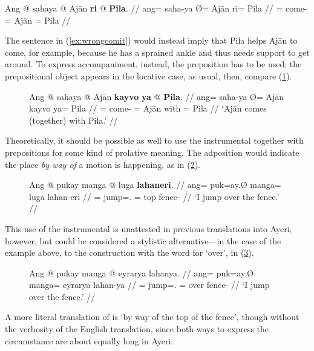 \ex\label{ex:wrongcomit}\ljudge* \begingl
	\gla Ang @ sahaya {} @ Ajān \textbf{ri} @ \textbf{Pila}. //
	\glb ang= saha-ya Ø= Ajān ri= Pila //
	\glc \AgtT{}= come-\TsgM{} \Top{}= Ajān \Ins{}= Pila //
\endgl\xe

The sentence in (\ref{ex:wrongcomit}) would instead imply that Pila helps Ajān
to come, for example, because he has a sprained ankle and thus needs support to
get around. To express accompaniment, instead, the preposition
 has to be used; the prepositional
object appears in the locative case, as usual, then, compare
(\ref{ex:comitwith}).

\begin{figure}[h]
\ex\label{ex:comitwith}%
\begingl
	\gla Ang @ sahaya {} @ Ajān \textbf{kayvo} \textbf{ya} @ \textbf{Pila}. //
	\glb ang= saha-ya Ø= Ajān kayvo ya= Pila //
	\glc \AgtT{}= come-\TsgM{} \Top{}= Ajān with \Loc{}= Pila //
	\glft `Ajān comes (together) with Pila.' //
\endgl\xe
\end{figure}

Theoretically, it should be possible as well to use the instrumental together
with prepositions for some kind of prolative meaning. The adposition would
indicate the place \emph{by way of} a motion is happening, as in
(\ref{ex:viains}).

\begin{figure}[h]
\ex\label{ex:viains}
\begingl
	\gla Ang @ pukay manga @ luga \textbf{lahaneri}. //
	\glb ang= puk=ay.Ø manga= luga lahan-eri //
	\glc \AgtT{}= jump=\Fsg{}.\Top{} \Dir{}= top fence-\Ins{} //
	\glft `I jump over the fence.' //
\endgl\xe
\end{figure}

This use of the instrumental is unattested in previous translations into Ayeri,
however, but could be considered a stylistic alternative---in the case of the
example above, to the construction with the word for `over',
 in (\ref{ex:vialoc}).

\begin{figure}[h]
\ex\label{ex:vialoc}
\begingl
	\gla Ang @ pukay manga @ eyrarya lahanya. //
	\glb ang= puk=ay.Ø manga= eyrarya lahan-ya //
	\glc \AgtT{}= jump=\Fsg{}.\Top{} \Dir{}= over fence-\Loc{} //
	\glft `I jump over the fence.' //
\endgl\xe
\end{figure}

A more literal translation of  is `by
way of the top of the fence', though without the verbosity of the English
translation, since both ways to express the circumstance are about equally long
in Ayeri.


